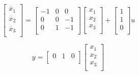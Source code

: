 \documentclass{article}
\begin{document}
\begin{equation*}       %
    \left[                %
    \begin{array}{c}   %
    \dot{x_1} \\  %
    \dot{x_2} \\  %
    \dot{x_3} \\
    \end{array}
    \right]=      %
    \left[                %
    \begin{array}{ccc}   %
    -1 & 0 & 0\\
    0 & 0 & -1\\
    0 & 1 & -1\\    
    \end{array}
    \right]
    \left[                %
    \begin{array}{c}   %
    x_1 \\  %
    x_2 \\  %
    x_3 \\
    \end{array}
    \right]+
    \left[                %
    \begin{array}{c}   %
    1 \\  %
    1 \\  %
    0 \\
    \end{array}
    \right]u               
\end{equation*}

\begin{equation*}
y=\left[
\begin{array}{ccc}
0 & 1 & 0\\
\end{array}
\right]
\left[
\begin{array}{c}
x_1 \\  %
x_2 \\  %
x_3 \\
\end{array}
\right]
\end{equation*}
\end{document}
